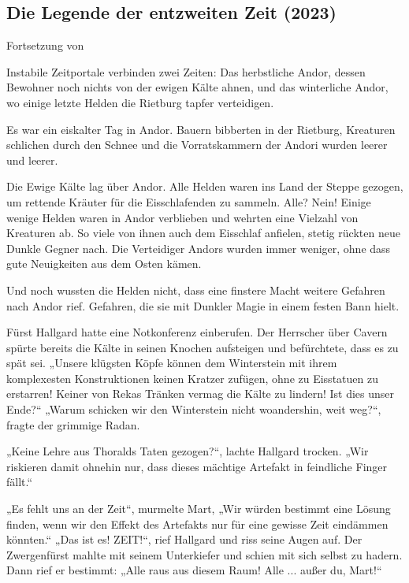 \begin{chapterbox}
    \chapter{Die Legende der entzweiten Zeit (2023)}
    \label{Die Legende der entzweiten Zeit (2023)}

    \begin{center}
        Fortsetzung von 
    \end{center}
    
    Instabile Zeitportale verbinden zwei Zeiten: Das herbstliche Andor, dessen Bewohner noch nichts von der ewigen Kälte ahnen, und das winterliche Andor, wo einige letzte Helden die Rietburg tapfer verteidigen.
\end{chapterbox}



Es war ein eiskalter Tag in Andor. Bauern bibberten in der Rietburg, Kreaturen schlichen durch den Schnee und die Vorratskammern der Andori wurden leerer und leerer.

Die Ewige Kälte lag über Andor. Alle Helden waren ins Land der Steppe gezogen, um rettende Kräuter für die Eisschlafenden zu sammeln. Alle? Nein! Einige wenige Helden waren in Andor verblieben und wehrten eine Vielzahl von Kreaturen ab. So viele von ihnen auch dem Eisschlaf anfielen, stetig rückten neue Dunkle Gegner nach. Die Verteidiger Andors wurden immer weniger, ohne dass gute Neuigkeiten aus dem Osten kämen. 

Und noch wussten die Helden nicht, dass eine finstere Macht weitere Gefahren nach Andor rief. Gefahren, die sie mit Dunkler Magie in einem festen Bann hielt.

Fürst Hallgard hatte eine Notkonferenz einberufen. Der Herrscher über Cavern spürte bereits die Kälte in seinen Knochen aufsteigen und befürchtete, dass es zu spät sei. „Unsere klügsten Köpfe können dem Winterstein mit ihrem komplexesten Konstruktionen keinen Kratzer zufügen, ohne zu Eisstatuen zu erstarren! Keiner von Rekas Tränken vermag die Kälte zu lindern! Ist dies unser Ende?“ „Warum schicken wir den Winterstein nicht woandershin, weit weg?“, fragte der grimmige Radan. 

„Keine Lehre aus Thoralds Taten gezogen?“, lachte Hallgard trocken. „Wir riskieren damit ohnehin nur, dass dieses mächtige Artefakt in feindliche Finger fällt.“

„Es fehlt uns an der Zeit“, murmelte Mart, „Wir würden bestimmt eine Lösung finden, wenn wir den Effekt des Artefakts nur für eine gewisse Zeit eindämmen könnten.“ „Das ist es! ZEIT!“, rief Hallgard und riss seine Augen auf. Der Zwergenfürst mahlte mit seinem Unterkiefer und schien mit sich selbst zu hadern. Dann rief er bestimmt: „Alle raus aus diesem Raum! Alle ... außer du, Mart!“

